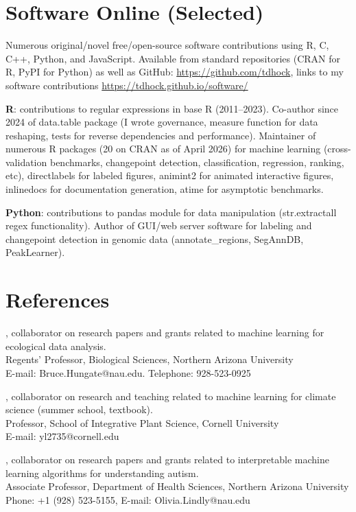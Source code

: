 \documentclass[margin,line]{res}
\begin{document}
\begin{resume}
\section{\sc Software Online (Selected)} 

Numerous original/novel free/open-source software contributions using R, C, C++,
Python, and JavaScript. Available from standard repositories (CRAN for
R, PyPI for Python) as well as GitHub:
\url{https://github.com/tdhock}, links to my software contributions
\url{https://tdhock.github.io/software/}

{\bf R}: contributions to regular expressions in base R (2011--2023). Co-author since 2024 of data.table package (I wrote governance, measure function for data reshaping, tests for reverse dependencies and performance). Maintainer of numerous R
packages (20 on CRAN as of April 2026) for machine learning
(cross-validation benchmarks, changepoint detection, classification,
regression, ranking, etc), directlabels for labeled figures, animint2
for animated interactive figures, inlinedocs for documentation
generation, atime for asymptotic benchmarks.

{\bf Python}: contributions to pandas module for data manipulation
(str.extractall regex functionality). Author of GUI/web server
software for labeling and changepoint detection in genomic data
(annotate\_regions, SegAnnDB, PeakLearner).

\section{\sc References}
 
, collaborator on research papers and grants related to machine learning for ecological data analysis. \\
Regents' Professor, Biological Sciences, Northern Arizona University\\
E-mail: Bruce.Hungate@nau.edu. Telephone: 928-523-0925

, collaborator on research and teaching related to machine learning for climate science (summer school, textbook).\\
Professor, School of Integrative Plant Science, Cornell University\\
E-mail: yl2735@cornell.edu

, collaborator on research papers and grants related to interpretable machine learning algorithms for understanding autism.\\
Associate Professor, Department of Health Sciences, Northern Arizona University\\
Phone: +1 (928) 523-5155, E-mail: Olivia.Lindly@nau.edu


\end{resume}
\end{document}
